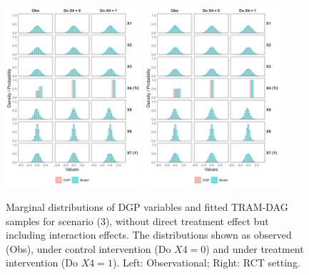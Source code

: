 \begin{figure}[htbp]
\centering
\includegraphics[width=0.45\textwidth]{img/results/observ_scenario3_sampling_distributions_vertical.png}
\includegraphics[width=0.45\textwidth]{img/results/rct_scenario3_sampling_distributions_vertical.png}
\caption{Marginal distributions of DGP variables and fitted TRAM-DAG samples for scenario (3), without direct treatment effect but including interaction effects. The distributions shown as observed (Obs), under control intervention (Do $X4=0$) and under treatment intervention (Do $X4=1$). Left: Observational; Right: RCT setting.}
\label{fig:scenario3_sampling_distributions_vertical}
\end{figure}


